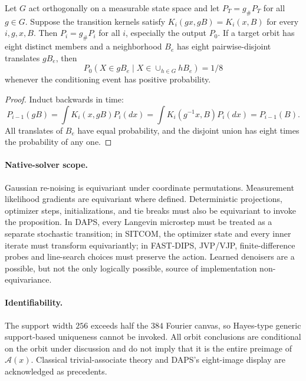 \begin{proposition}
\label{prop:th1-equivariant-chain}
Let \(G\) act orthogonally on a measurable state space and let
\(P_T=g_\#P_T\) for all \(g\in G\). Suppose the transition kernels
satisfy \(K_i(gx,gB)=K_i(x,B)\) for every \(i,g,x,B\).
Then \(P_i=g_\#P_i\) for all \(i\), especially the output \(P_0\).
If a target orbit has eight distinct members and a neighborhood
\(B_e\) has eight pairwise-disjoint translates \(gB_e\), then
\[
 P_0(X\in gB_e\mid X\in\cup_{h\in G}hB_e)=1/8
\]
whenever the conditioning event has positive probability.
\end{proposition}
\begin{proof}
Induct backwards in time:
\[
 P_{i-1}(gB)=\int K_i(x,gB)P_i(dx)
 =\int K_i(g^{-1}x,B)P_i(dx)
 =P_{i-1}(B).
\]
All translates of \(B_e\) have equal probability, and the
disjoint union has eight times the probability of any one.
\end{proof}

\paragraph{Native-solver scope.}
Gaussian re-noising is equivariant under coordinate permutations.
Measurement likelihood gradients are equivariant where defined.
Deterministic projections, optimizer steps, initializations, and tie
breaks must also be equivariant to invoke the proposition.
In DAPS, every Langevin microstep must be treated as a separate
stochastic transition; in SITCOM, the optimizer state and every inner
iterate must transform equivariantly; in FAST-DIPS, JVP/VJP,
finite-difference probes and line-search choices must preserve
the action. Learned denoisers are a possible, but not the only
logically possible, source of implementation non-equivariance.

\paragraph{Identifiability.}
The support width \(256\) exceeds half the \(384\) Fourier canvas,
so Hayes-type generic support-based uniqueness cannot be invoked.
All orbit conclusions are conditional on the orbit under discussion
and do not imply that it is the entire preimage of \(\mathcal A(x)\).
Classical trivial-associate theory and DAPS's eight-image display
are acknowledged as precedents.
